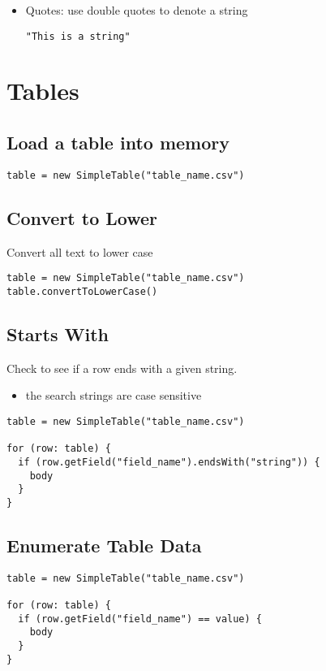 \documentclass{article}
\begin{document}
\begin{itemize}
  \item Quotes: use double quotes to denote a string
\begin{lstlisting}
"This is a string"
\end{lstlisting}

\end{itemize}

\section{Tables}

\subsection{Load a table into memory}
\begin{lstlisting}
table = new SimpleTable("table_name.csv")
\end{lstlisting}

\subsection{Convert to Lower}
Convert all text to lower case
\begin{lstlisting}
table = new SimpleTable("table_name.csv")
table.convertToLowerCase()
\end{lstlisting}

\subsection{Starts With}
Check to see if a row ends with a given string.
\begin{itemize}
  \item the search strings are case sensitive
\end{itemize}
\begin{lstlisting}
table = new SimpleTable("table_name.csv")

for (row: table) {
  if (row.getField("field_name").endsWith("string")) {
    body
  }
}
\end{lstlisting}

\subsection{Enumerate Table Data}
\begin{lstlisting}
table = new SimpleTable("table_name.csv")

for (row: table) {
  if (row.getField("field_name") == value) {
    body
  }
}
\end{lstlisting}
\end{document}
